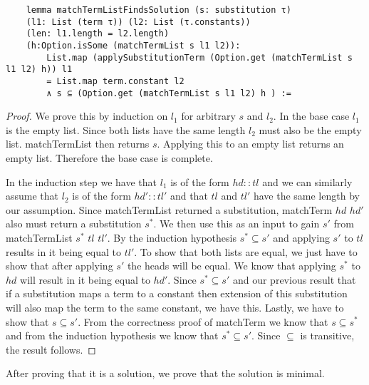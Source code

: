 \begin{lstlisting}
    lemma matchTermListFindsSolution (s: substitution τ)
    (l1: List (term τ)) (l2: List (τ.constants))
    (len: l1.length = l2.length)
    (h:Option.isSome (matchTermList s l1 l2)):
        List.map (applySubstitutionTerm (Option.get (matchTermList s l1 l2) h)) l1 
        = List.map term.constant l2 
        ∧ s ⊆ (Option.get (matchTermList s l1 l2) h ) :=
\end{lstlisting}
\begin{proof}
    We prove this by induction on $l_1$ for arbitrary $s$ and $l_2$.
    In the base case $l_1$ is the empty list. Since both lists have the same length $l_2$ must also be the empty list. matchTermList then returns $s$. Applying this to an empty list returns an empty list. Therefore the base case is complete.

    In the induction step we have that $l_1$ is of the form $hd::tl$ and we can similarly assume that $l_2$ is of the form $hd'::tl'$ and that $tl$ and $tl'$ have the same length by our assumption. Since matchTermList returned a substitution, matchTerm $hd$ $hd'$ also must return a substitution $s^\ast$.
    We then use this as an input to gain $s'$ from matchTermList $s^\ast$ $tl$ $tl'$. By the induction hypothesis $s^\ast \subseteq s'$ and applying $s'$ to $tl$ results in it being equal to $tl'$. To show that both lists are equal, we just have to show that after applying $s'$ the heads will be equal. We know that applying $s^\ast$ to $hd$ will result in it being equal to $hd'$. Since $s^\ast \subseteq s'$ and our previous result that if a substitution maps a term to a constant then extension of this substitution will also map the term to the same constant, we have this.
    Lastly, we have to show that $s \subseteq s'$. From the correctness proof of matchTerm we know that $s \subseteq s^\ast$ and from the induction hypothesis we know that $s^\ast \subseteq s'$. Since $\subseteq$ is transitive, the result follows.
\end{proof}

After proving that it is a solution, we prove that the solution is minimal.

